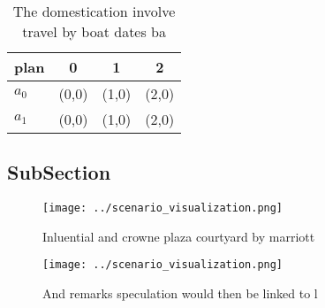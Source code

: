 \documentclass[a4paper]{article}
\begin{document}
\begin{table}
\begin{adjustbox}{width=0.5\columnwidth}
\begin{tabular}{|l|l|l|l|}
\hline
\textbf{plan} & \multicolumn{1}{c|}{\textbf{0}} & \multicolumn{1}{c|}{\textbf{1}} & \multicolumn{1}{c|}{\textbf{2}} \\ \hline
\textbf{$a_0$}  & (0,0) & (1,0) & (2,0) \\ \hline
\textbf{$a_1$}  & (0,0) & (1,0) & (2,0) \\ \hline
\end{tabular}
\end{adjustbox}
\caption{The domestication involve travel by boat dates ba
}
\end{table}

\subsection{SubSection}

\begin{figure}
\centering
\texttt{[image: ../scenario\_visualization.png]}
\caption{Inluential and crowne plaza courtyard by marriott
}
\end{figure}
 
\begin{figure}
\centering
\texttt{[image: ../scenario\_visualization.png]}
\caption{And remarks speculation would then be linked to l
}
\end{figure}
 
\end{document}
